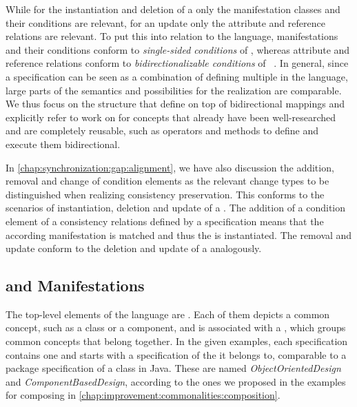 While for the instantiation and deletion of a \commonality only the manifestation classes and their conditions are relevant, for an update only the attribute and reference relations are relevant.
To put this into relation to the \mappings language, manifestations and their conditions conform to \emph{single-sided conditions} of \mappings, whereas attribute and reference relations conform to \emph{bidirectionalizable conditions} of \mappings~\cite[Sec. 7.2.1]{klare2020Vitruv-JSS}.
In general, since a \commonalities specification can be seen as a combination of defining multiple \mappings in the \mappings language, large parts of the semantics and possibilities for the realization are comparable.
We thus focus on the structure that \commonalities define on top of bidirectional mappings and explicitly refer to work on \mappings for concepts that already have been well-researched and are completely reusable, such as operators and methods to define and execute them bidirectional.

In \autoref{chap:synchronization:gap:alignment}, we have also discussion the addition, removal and change of condition elements as the relevant change types to be distinguished when realizing consistency preservation.
This conforms to the scenarios of instantiation, deletion and update of a \commonality.
The addition of a condition element of a consistency relations defined by a \commonality specification means that the according manifestation is matched and thus the \commonality is instantiated.
The removal and update conform to the deletion and update of a \commonality analogously.


\subsection{\Commonalities and Manifestations}

The top-level elements of the \commonalities language are \commonalities.
Each of them depicts a common concept, such as a class or a component, and is associated with a \conceptmetamodel, which groups common concepts that belong together.
In the given examples, each specification contains one \commonality and starts with a specification of the \conceptmetamodel it belongs to, comparable to a package specification of a class in Java.
These \conceptmetamodels are named \emph{ObjectOrientedDesign} and \emph{ComponentBasedDesign}, according to the ones we proposed in the examples for composing \commonalities in \autoref{chap:improvement:commonalities:composition}.

